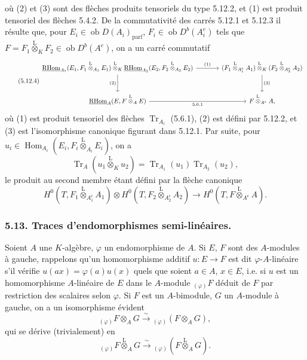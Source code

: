 \documentclass[11pt]{article}
\DeclareMathOperator{\Hom}{Hom}
\newcommand{\R}{\mathrm{R}}\newcommand{\RHomCore}{\mathrm{RHom}}
\newcommand{\ob}{\operatorname{ob}}
\providecommand{\RHom}{\RHomCore}
\providecommand{\uRHom}{\underline{\RHom}}
\providecommand{\Tr}{\operatorname{Tr}}
\providecommand{\Tr}{\operatorname{Tr}}
\providecommand{\lten}{\overset{\mathrm L}{\otimes}}
\providecommand{\Tr}{\operatorname{Tr}}
\providecommand{\RHom}{\RHomCore}
\providecommand{\Hom}{\operatorname{Hom}}
\providecommand{\ob}{\operatorname{ob}}
\providecommand{\lten}{\overset{\mathrm L}{\otimes}}
\providecommand{\RHom}{\R\mathcal{H}om}
\providecommand{\lten}{\overset{\mathrm L}{\otimes}}
\providecommand{\R}{\mathrm R}
\providecommand{\Tr}{\operatorname{Tr}}
\providecommand{\lten}{\overset{\mathrm L}{\otimes}}
\providecommand{\lten}{\overset{\mathrm L}{\otimes}}
\providecommand{\lten}{\overset{\mathrm L}{\otimes}}
\providecommand{\RHom}{\RHomCore}
\providecommand{\Hom}{\operatorname{Hom}}
\providecommand{\Tr}{\operatorname{Tr}}
\providecommand{\lten}{\overset{\mathrm L}{\otimes}}
\begin{document}
où (2) et (3) sont des flèches produits tensoriels du type 5.12.2, et (1) est produit tensoriel des flèches 5.4.2. De la commutativité des carrés 5.12.1 et 5.12.3 il résulte que, pour $E_i\in\ob D(A_i)_{\mathrm{parf}}$, $F_i\in\ob D^b(A_i^e)$ tels que $F=F_1\lten_KF_2\in\ob D^b(A^e)$, on a un carré commutatif
\begin{equation}\tag{5.12.4}
\begin{tikzcd}[column sep=large,row sep=large]
\uRHom_{A_1}(E_1,F_1\lten_{A_1}E_1)\lten_K\uRHom_{A_2}(E_2,F_2\lten_{A_2}E_2) \arrow[r,"(1)"] \arrow[d,"(2)"'] & (F_1\lten_{A_1^e}A_1)\lten_K(F_2\lten_{A_2^e}A_2) \arrow[d,"(3)"]\\
\uRHom_A(E,F\lten_AE) \arrow[r,"5.6.1"'] & F\lten_{A^e}A,
\end{tikzcd}
\end{equation}
où (1) est produit tensoriel des flèches $\Tr_{A_i}$ (5.6.1), (2) est défini par 5.12.2, et (3) est l'isomorphisme canonique figurant dans 5.12.1. Par suite, pour $u_i\in\Hom_{A_i}(E_i,F_i\lten_{A_i}E_i)$, on a
\begin{equation}\tag{5.12.5}
\Tr_A(u_1\lten_Ku_2)=\Tr_{A_1}(u_1)\Tr_{A_2}(u_2),
\end{equation}
le produit au second membre étant défini par la flèche canonique
\[
H^0(T,F_1\lten_{A_1^e}A_1)\otimes H^0(T,F_2\lten_{A_2^e}A_2)
\longrightarrow H^0(T,F\lten_{A^e}A).
\]

\subsubsection*{5.13. Traces d'endomorphismes semi-linéaires.}

Soient $A$ une $K$-algèbre, $\varphi$ un endomorphisme de $A$. Si $E$, $F$ sont des $A$-modules à gauche, rappelons qu'un homomorphisme additif $u:E\to F$ est dit $\varphi$-$A$-linéaire s'il vérifie $u(ax)=\varphi(a)u(x)$ quels que soient $a\in A$, $x\in E$, i.e. si $u$ est un homomorphisme $A$-linéaire de $E$ dans le $A$-module ${}_{(\varphi)}F$ déduit de $F$ par restriction des scalaires selon $\varphi$. Si $F$ est un $A$-bimodule,
$G$ un $A$-module à gauche, on a un isomorphisme évident
\[
{}_{(\varphi)}F\otimes_AG\xrightarrow{\sim}{}_{(\varphi)}(F\otimes_AG),
\]
qui se dérive (trivialement) en
\[
{}_{(\varphi)}F\lten_AG\xrightarrow{\sim}{}_{(\varphi)}(F\lten_AG).
\]
\end{document}
